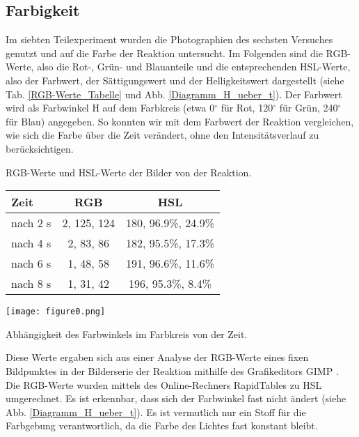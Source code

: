 \subsection{Farbigkeit}

Im siebten Teilexperiment wurden die Photographien des sechsten Versuches genutzt und auf die Farbe der Reaktion untersucht. Im Folgenden sind die RGB-Werte, also die Rot-, Grün- und Blauanteile und die entsprechenden HSL-Werte, also der Farbwert, der Sättigungswert und der Helligkeitswert dargestellt (siehe Tab. \ref{RGB-Werte_Tabelle} und Abb. \ref{Diagramm_H_ueber_t}). Der Farbwert wird als Farbwinkel H auf dem Farbkreis (etwa 0$^\circ$ für Rot, 120$^\circ$ für Grün, 240$^\circ$ für Blau) angegeben. So konnten wir mit dem Farbwert der Reaktion vergleichen, wie sich die Farbe über die Zeit verändert, ohne den Intensitätsverlauf zu berücksichtigen.

\begin{dsatable}
 \centering
 \caption{RGB-Werte und HSL-Werte der Bilder von der Reaktion.}
 \begin{tabular}{lcc} %
  \toprule
   Zeit  & RGB & HSL\\
  \midrule
   nach 2 s  & 2, 125, 124 &   180, 96.9\%, 24.9\%    \\
   nach 4 s  & 2, 83, 86   &   182, 95.5\%, 17.3\%    \\
   nach 6 s  & 1, 48, 58   &   191, 96.6\%, 11.6\%    \\
   nach 8 s  & 1, 31, 42   &   196, 95.3\%, 8.4\%     \\ 
  \bottomrule
 \end{tabular}
 \label{RGB-Werte_Tabelle}
 
\end{dsatable}

\begin{dsafigure}
	\centering
	\texttt{[image: figure0.png]}
	\label{Diagramm_H_ueber_t}
	\caption{Abhängigkeit des Farbwinkels im Farbkreis von der Zeit.}
\end{dsafigure}

Diese Werte ergaben sich aus einer Analyse der RGB-Werte eines fixen Bildpunktes in der Bilderserie der Reaktion mithilfe des Grafikeditors GIMP \cite{GIMP}. Die RGB-Werte wurden mittels des Online-Rechners RapidTables \cite{RapidTables} zu HSL umgerechnet. Es ist erkennbar, dass sich der Farbwinkel fast nicht ändert (siehe Abb. \ref{Diagramm_H_ueber_t}). Es ist vermutlich nur ein Stoff für die Farbgebung verantwortlich, da die Farbe des Lichtes fast konstant bleibt.
